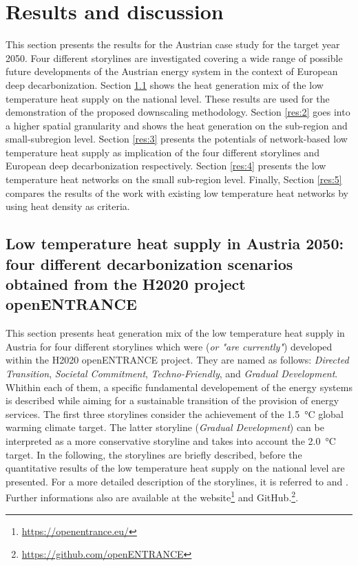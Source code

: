 \section{Results and discussion}

This section presents the results for the Austrian case study for the target year 2050. Four different storylines are investigated covering a wide range of possible future developments of the Austrian energy system in the context of European deep decarbonization. Section \ref{res:1} shows the heat generation mix of the low temperature heat supply on the national level. These results are used for the demonstration of the proposed downscaling methodology. Section \ref{res:2} goes into a higher spatial granularity and shows the heat generation on the sub-region and small-subregion level. Section \ref{res:3} presents the potentials of network-based low temperature heat supply as implication of the four different storylines and European deep decarbonization respectively. Section \ref{res:4} presents the low temperature heat networks on the small sub-region level. Finally, Section \ref{res:5} compares the results of the work with existing low temperature heat networks by using heat density as criteria.

\subsection{Low temperature heat supply in Austria 2050: four different decarbonization scenarios obtained from the H2020 project openENTRANCE}\label{res:1}
This section presents heat generation mix of the low temperature heat supply in Austria for four different storylines which were (\textit{or "are currently"}) developed within the H2020 openENTRANCE project. They are named as follows: \textit{Directed Transition}, \textit{Societal Commitment}, \textit{Techno-Friendly}, and \textit{Gradual Development}. Whithin each of them, a specific fundamental developement of the energy systems is described while aiming for a sustainable transition of the provision of energy services. The first three storylines consider the achievement of the \SI{1.5}{\degreeCelsius} global warming climate target. The latter storyline (\textit{Gradual Development}) can be interpreted as a more conservative storyline and takes into account the \SI{2.0}{\degreeCelsius} target. In the following, the storylines are briefly described, before the quantitative results of the low temperature heat supply on the national level are presented. For a more detailed description of the storylines, it is referred to \cite{auer2020quantitative} and \cite{auer2020development}. Further informations also are available at the website\footnote{\url{https://openentrance.eu/}} and GitHub.\footnote{\url{https://github.com/openENTRANCE}}.\newline

